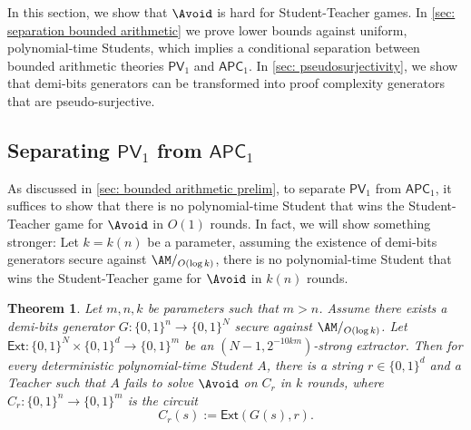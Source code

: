 \documentclass[10pt,a4paper]{article}
\newtheorem{theorem}{Theorem}[section]
\theoremstyle{definition}
\theoremstyle{remark}
\newcommand{\Ext}{\mathsf{Ext}}
\newcommand{\PV}{\mathsf{PV}}
\newcommand{\APC}{\mathsf{APC}}
\begin{document}
In this section, we show that $\Avoid$ is hard for Student-Teacher games. In \autoref{sec: separation bounded arithmetic} we prove lower bounds against uniform, polynomial-time Students, which implies a conditional separation between bounded arithmetic theories $\PV_1$ and $\APC_1$. In \autoref{sec: pseudosurjectivity}, we show that demi-bits generators can be transformed into proof complexity generators that are pseudo-surjective.

\subsection{Separating \texorpdfstring{$\PV_1$}{PV1} from \texorpdfstring{$\APC_1$}{APC1}}\label{sec: separation bounded arithmetic}

As discussed in \autoref{sec: bounded arithmetic prelim}, to separate $\PV_1$ from $\APC_1$, it suffices to show that there is no polynomial-time Student that wins the Student-Teacher game for $\Avoid$ in $O(1)$ rounds. In fact, we will show something stronger: Let $k = k(n)$ be a parameter, assuming the existence of demi-bits generators secure against $\AM/_{O(\log k)}$, there is no polynomial-time Student that wins the Student-Teacher game for $\Avoid$ in $k(n)$ rounds.


\begin{theorem}\label{thm:no-avoid^O(1)}
    Let $m, n, k$ be parameters such that $m > n$. Assume there exists a demi-bits generator $G: \{0,1\}^n \to \{0,1\}^N$ secure against $\AM/_{O(\log k)}$. Let $\Ext: \{0,1\}^N \times \{0,1\}^d \to \{0,1\}^m$ be an $(N-1, 2^{-10km})$-strong extractor. Then for every deterministic polynomial-time Student $A$, there is a string $r\in \{0,1\}^d$ and a Teacher such that $A$ fails to solve $\Avoid$ on $C_r$ in $k$ rounds, where $C_r: \{0,1\}^n \to \{0,1\}^m$ is the circuit
    \[C_r(s) := \Ext(G(s), r).\]
\end{theorem}
\end{document}
